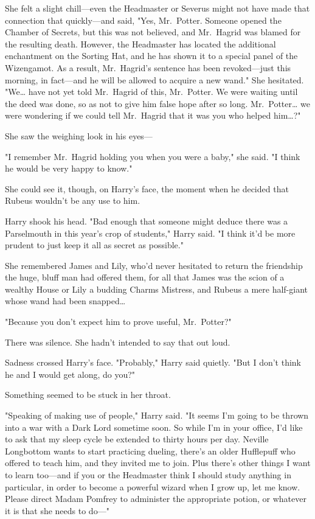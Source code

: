 She felt a slight chill---even the Headmaster or Severus might not have made 
that connection that quickly---and said, "Yes, Mr.~Potter. Someone opened the 
Chamber of Secrets, but this was not believed, and Mr.~Hagrid was blamed for 
the resulting death. However, the Headmaster has located the additional 
enchantment on the Sorting Hat, and he has shown it to a special panel of the 
Wizengamot. As a result, Mr.~Hagrid's sentence has been revoked---just this 
morning, in fact---and he will be allowed to acquire a new wand." She 
hesitated. "We{\ldots} have not yet told Mr.~Hagrid of this, Mr.~Potter. We 
were waiting until the deed was done, so as not to give him false hope after so 
long. Mr.~Potter{\ldots} we were wondering if we could tell Mr.~Hagrid that it 
was you who helped him{\ldots}?"

She saw the weighing look in his eyes---

"I remember Mr.~Hagrid holding you when you were a baby," she said. "I think he 
would be very happy to know."

She could see it, though, on Harry's face, the moment when he decided that 
Rubeus wouldn't be any use to him.

Harry shook his head. "Bad enough that someone might deduce there was a 
Parselmouth in this year's crop of students," Harry said. "I think it'd be more 
prudent to just keep it all as secret as possible."

She remembered James and Lily, who'd never hesitated to return the friendship 
the huge, bluff man had offered them, for all that James was the scion of a 
wealthy House or Lily a budding Charms Mistress, and Rubeus a mere half-giant 
whose wand had been snapped{\ldots}

"Because you don't expect him to prove useful, Mr.~Potter?"

There was silence. She hadn't intended to say that out loud.

Sadness crossed Harry's face. "Probably," Harry said quietly. "But I don't 
think he and I would get along, do you?"

Something seemed to be stuck in her throat.

"Speaking of making use of people," Harry said. "It seems I'm going to be 
thrown into a war with a Dark Lord sometime soon. So while I'm in your office, 
I'd like to ask that my sleep cycle be extended to thirty hours per day. 
Neville Longbottom wants to start practicing dueling, there's an older 
Hufflepuff who offered to teach him, and they invited me to join. Plus there's 
other things I want to learn too---and if you or the Headmaster think I should 
study anything in particular, in order to become a powerful wizard when I grow 
up, let me know. Please direct Madam Pomfrey to administer the appropriate 
potion, or whatever it is that she needs to do---"

